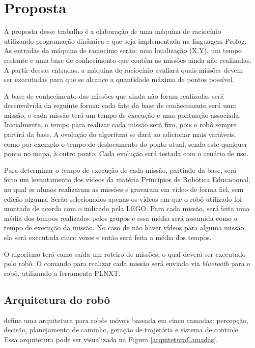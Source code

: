 \chapter{Proposta}
A proposta desse trabalho é a elaboração de uma máquina de raciocínio utilizando programação dinâmica e que seja implementada na linguagem Prolog. As entradas da máquina de raciocínio serão: uma localização (X,Y), um tempo restante e uma base de conhecimento que contém as missões ainda não realizadas. A partir dessas entradas, a máquina de raciocínio avaliará quais missões devem ser executadas para que se alcance a quantidade máxima de pontos possível.

A base de conhecimento das missões que ainda não foram realizadas será desenvolvida da seguinte forma: cada fato da base de conhecimento será uma missão, e cada missão terá um tempo de execução e uma pontuação associada. Inicialmente, o tempo para realizar cada missão será fixo, pois o robô sempre partirá da base. A evolução do algoritmo se dará ao adicionar mais variáveis, como por exemplo o tempo de deslocamento do ponto atual, sendo este qualquer ponto no mapa, à outro ponto. Cada evolução será testada com o cenário de uso.

Para determinar o tempo de execução de cada missão, partindo da base, será feito um levantamento dos vídeos da matéria Princípios de Robótica Educacional, no qual os alunos realizaram as missões e gravaram em vídeo de forma fiel, sem edição alguma. Serão selecionados apenas os vídeos em que o robô utilizado foi montado de acordo com o indicado pela LEGO. Para cada missão, será feita uma média dos tempos realizados pelos grupos e essa média será assumida como o tempo de execução da missão. No caso de não haver vídeos para alguma missão, ela será executada cinco vezes e então será feita a média dos tempos.

O algoritmo terá como saída um roteiro de missões, o qual deverá ser executado pelo robô. O comando para realizar cada missão será enviado via \textit{bluetooth} para o robô, utilizando a ferramenta PLNXT.

\section{Arquitetura do robô}
 define uma arquitetura para robôs móveis baseada em cinco camadas: percepção, decisão, planejamento de caminho, geração de trajetória e sistema de controle. Essa arquitetura pode ser visualizada na Figura \ref{arquiteturaCamadas}.
\clearpage

